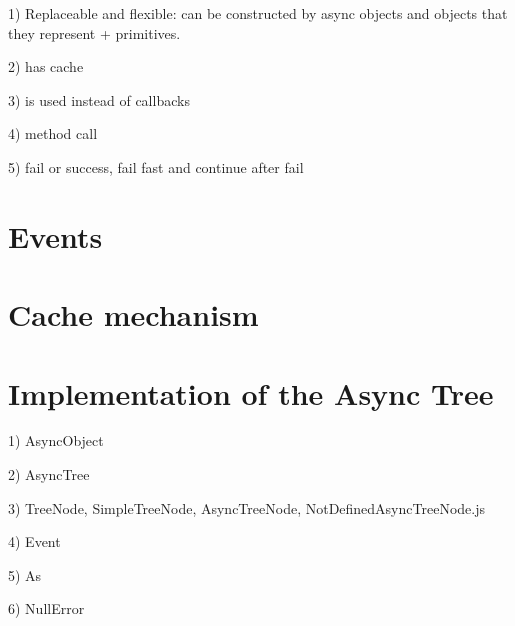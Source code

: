 \documentclass{article}
\begin{document}
1) Replaceable and flexible: can be constructed by async objects and objects that they represent + primitives.

2) has cache

3) is used instead of callbacks

4) method call

5) fail or success, fail fast and continue after fail


\section{Events}

\section{Cache mechanism}

\section{Implementation of the Async Tree}

1) AsyncObject

2) AsyncTree

3) TreeNode, SimpleTreeNode, AsyncTreeNode, NotDefinedAsyncTreeNode.js

4) Event

5) As

6) NullError
\end{document}
